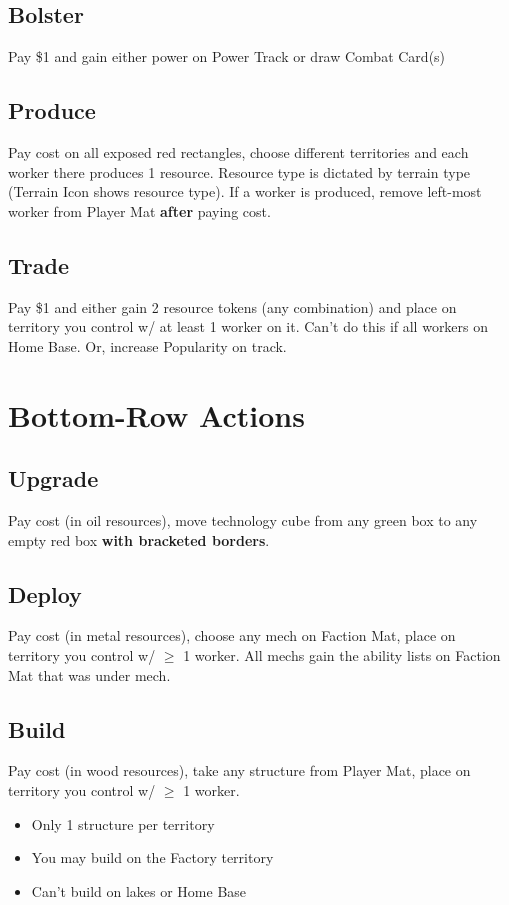 \documentclass[12pt]{article}
\newenvironment{itemizeCustom}
{\begin{itemize}
  \setlength{\itemsep}{1pt}
  \setlength{\parskip}{0pt}
  \setlength{\parsep}{0pt}}
{\end{itemize}}
\begin{document}
\begin{multicols*}{2}
\subsection*{Bolster}
Pay \$1 and gain either power on Power Track or draw Combat Card(s)

\subsection*{Produce}
Pay cost on all exposed red rectangles, choose different territories and each worker there produces 1 resource. Resource type is dictated by terrain type (Terrain Icon shows resource type). If a worker is produced, remove left-most worker from Player Mat \textbf{after} paying cost.

\subsection*{Trade}
Pay \$1 and either gain 2 resource tokens (any combination) and place on territory you control w/ at least 1 worker on it. Can't do this if all workers on Home Base. Or, increase Popularity on track.

\section*{Bottom-Row Actions}
\subsection*{Upgrade}
Pay cost (in oil resources), move technology cube from any green box to any empty red box \textbf{with bracketed borders}.

\subsection*{Deploy}
Pay cost (in metal resources), choose any mech on Faction Mat, place on territory you control w/ $\geq$ 1 worker. All mechs gain the ability lists on Faction Mat that was under mech.

\subsection*{Build}
Pay cost (in wood resources), take any structure from Player Mat, place on territory you control w/ $\geq$ 1 worker.

\begin{itemizeCustom}
    \item Only 1 structure per territory
    \item You may build on the Factory territory
    \item Can't build on lakes or Home Base
\end{itemizeCustom}



\end{multicols*}
\end{document}
